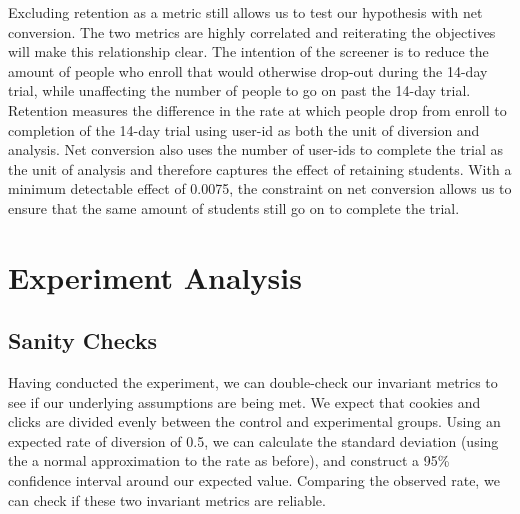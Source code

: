 \documentclass[paper=a4, fontsize=11pt]{scrartcl} %
\numberwithin{equation}{section} %
\numberwithin{figure}{section} %
\numberwithin{table}{section} %
\begin{document}
Excluding retention as a metric still allows us to test our hypothesis with net conversion.  The two metrics are highly correlated and reiterating the objectives will make this relationship clear. The intention of the screener is to reduce the amount of people who enroll that would otherwise drop-out during the 14-day trial, while unaffecting the number of people to go on past the 14-day trial.  Retention measures the difference in the rate at which people drop from enroll to completion of the 14-day trial using user-id as both the unit of diversion and analysis.  Net conversion also uses the number of user-id\textquotesingle s to complete the trial as the unit of analysis and therefore captures the effect of retaining students.  With a minimum detectable effect of 0.0075, the constraint on net conversion allows us to ensure that the same amount of students still go on to complete the trial. \newline




\section{Experiment Analysis}

\subsection{Sanity Checks}

Having conducted the experiment, we can double-check our invariant metrics to see if our underlying assumptions are being met.  We expect that cookies and clicks are divided evenly between the control and experimental groups.  Using an expected rate of diversion of 0.5, we can calculate the standard deviation (using the a normal approximation to the rate as before), and construct a 95\% confidence interval around our expected value.  Comparing the observed rate, we can check if these two invariant metrics are reliable.\newline
\end{document}
